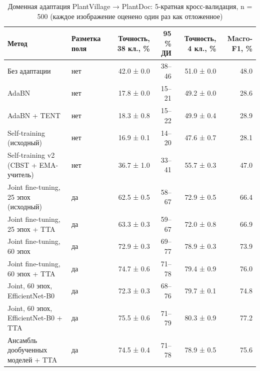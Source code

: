 \begin{table}[htbp]
\centering
\caption{Доменная адаптация PlantVillage → PlantDoc: 5-кратная кросс-валидация, n = 500 (каждое изображение оценено один раз как отложенное)}
\label{tab:da-cv}
\begin{tabular}{llrrrr}
\toprule
Метод & Разметка поля & Точность, 38 кл., \% & 95 \% ДИ & Точность, 4 кл., \% & Macro-F1, \% \\
\midrule
Без адаптации & нет & 42.0 ± 0.0 & 38–46 & 51.0 ± 0.0 & 48.0 \\
AdaBN & нет & 17.8 ± 0.0 & 15–21 & 49.2 ± 0.0 & 28.6 \\
AdaBN + TENT & нет & 18.3 ± 0.8 & 15–22 & 49.9 ± 0.4 & 28.9 \\
Self-training (исходный) & нет & 16.9 ± 0.1 & 14–20 & 47.6 ± 0.7 & 28.1 \\
Self-training v2 (CBST + EMA-учитель) & нет & 36.7 ± 1.0 & 33–41 & 55.7 ± 0.3 & 47.0 \\
Joint fine-tuning, 25 эпох (исходный) & да & 62.5 ± 0.5 & 58–67 & 72.9 ± 0.5 & 66.4 \\
Joint fine-tuning, 25 эпох + TTA & да & 63.3 ± 0.3 & 59–67 & 72.0 ± 0.8 & 66.9 \\
Joint fine-tuning, 60 эпох & да & 72.9 ± 0.3 & 69–77 & 78.9 ± 0.3 & 73.9 \\
Joint fine-tuning, 60 эпох + TTA & да & 74.7 ± 0.6 & 71–78 & 79.4 ± 0.9 & 76.0 \\
Joint, 60 эпох, EfficientNet-B0 & да & 72.3 ± 0.3 & 68–76 & 79.7 ± 0.1 & 74.8 \\
Joint, 60 эпох, EfficientNet-B0 + TTA & да & 75.5 ± 0.6 & 71–79 & 80.3 ± 0.9 & 77.2 \\
Ансамбль дообученных моделей + TTA & да & 74.5 ± 0.4 & 71–78 & 78.9 ± 0.5 & 75.6 \\
\bottomrule
\end{tabular}
\end{table}

